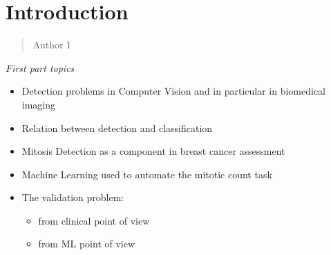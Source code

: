 \chapter{Introduction}
\label{Introduction}
\thispagestyle{empty}

\begin{quotation}
{\footnotesize
{}
\begin{flushright}
Author 1
\end{flushright}
}
\end{quotation}
\vspace{0.5cm}




\emph{First part topics}

\begin{itemize}
\item Detection problems in Computer Vision and in particular in biomedical imaging
\item Relation between detection and classification
\item Mitosis Detection as a component in breast cancer assessment
\item Machine Learning used to automate the mitotic count task
\item The validation problem:
	\begin{itemize}
	\item from clinical point of view
	\item from ML point of view
	\end{itemize}
\end{itemize}

